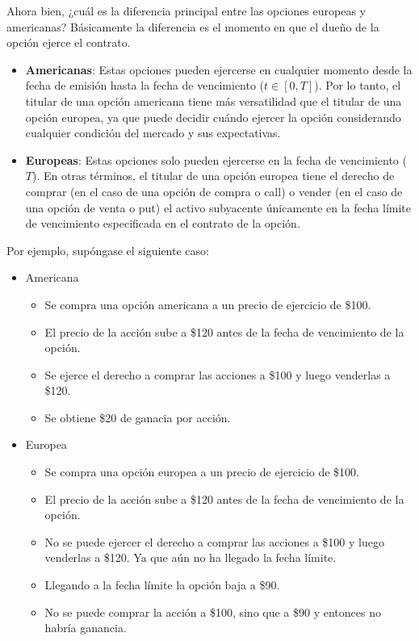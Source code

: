 \begin{problema}[Problema D]
\begin{itemize}
\begin{sol}
\begin{itemize}
 \end{itemize}

 Ahora bien, ¿cuál es la diferencia principal entre las opciones europeas y americanas? Básicamente la diferencia es el momento en que el dueño de la opción ejerce el contrato.
 \begin{itemize}
    \item \textbf{Americanas}:  Estas opciones pueden ejercerse en cualquier momento desde la fecha de emisión hasta la fecha de vencimiento ($t \in [0, T]$). Por lo tanto, el titular de una opción americana tiene más versatilidad que el titular de una opción europea, ya que puede decidir cuándo ejercer la opción considerando cualquier condición del mercado y sus expectativas.
    \item \textbf{Europeas}: Estas opciones solo pueden ejercerse en la fecha de vencimiento ($T$). En otras términos, el titular de una opción europea tiene el derecho de comprar (en el caso de una opción de compra o call) o vender (en el caso de una opción de venta o put) el activo subyacente únicamente en la fecha límite de vencimiento especificada en el contrato de la opción.
 \end{itemize}

 Por ejemplo, supóngase el siguiente caso:
 \begin{itemize}
    \item Americana 
    \begin{itemize}
        \item Se compra una opción americana a un precio de ejercicio de \$100.
        \item El precio de la acción sube a \$120 antes de la fecha de vencimiento de la opción. 
        \item Se ejerce el derecho a comprar las acciones a \$100 y luego venderlas a \$120.
        \item Se obtiene \$20 de ganacia por acción.
    \end{itemize}
    \item Europea
    \begin{itemize}
        \item Se compra una opción europea a un precio de ejercicio de \$100.
        \item El precio de la acción sube a \$120 antes de la fecha de vencimiento de la opción. 
        \item No se puede ejercer el derecho a comprar las acciones a \$100 y luego venderlas a \$120. Ya que aún no ha llegado la fecha límite. 
        \item Llegando a la fecha límite la opción baja a \$90. 
        \item No se puede comprar la acción a \$100, sino que a \$90 y entonces no habría ganancia. 
    \end{itemize}
\end{itemize}


\end{sol}
\end{itemize}
\end{problema}
